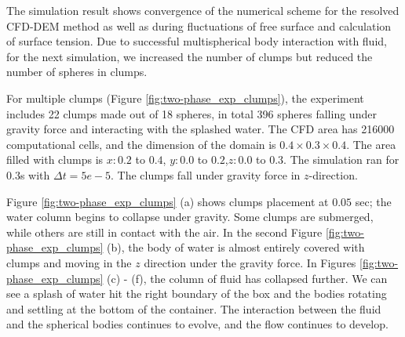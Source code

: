 The simulation result shows convergence of the numerical scheme for the resolved CFD-DEM method as well as during fluctuations of free surface and calculation of surface tension. Due to successful multispherical body interaction with fluid, for the next simulation, we increased the number of clumps but reduced the number of spheres in clumps. 



For multiple clumps (Figure \ref{fig:two-phase_exp_clumps}), the experiment includes 22 clumps made out of 18 spheres, in total 396 spheres falling under gravity force and interacting with the splashed water. The CFD area has 216000 computational cells, and the dimension of the domain is $0.4\times 0.3\times0.4$. The area filled with clumps is $x:0.2$ to $0.4$, $y: 0.0$ to $ 0.2$,$ z:0.0$ to $ 0.3$. The simulation ran for $0.3$s with $\Delta t = 5e-5$. The clumps fall under gravity force in $z$-direction.

Figure \ref{fig:two-phase_exp_clumps} (a) shows clumps placement at $0.05$ sec; the water column begins to collapse under gravity. Some clumps are submerged, while others are still in contact with the air. In the second Figure \ref{fig:two-phase_exp_clumps} (b), the body of water is almost entirely covered with clumps and moving in the $z$ direction under the gravity force. In Figures \ref{fig:two-phase_exp_clumps} (c) - (f), the column of fluid has collapsed further. We can see a splash of water hit the right boundary of the box and the bodies rotating and settling at the bottom of the container. The interaction between the fluid and the spherical bodies continues to evolve, and the flow continues to develop.


